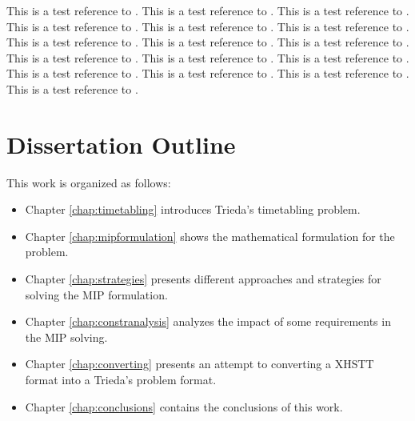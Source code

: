 This is a test reference to \cite{Carter2001}.    %
This is a test reference to \cite{Murray2007}.    %
This is a test reference to \cite{Unitime}.       %
This is a test reference to \cite{DSS}.           %
This is a test reference to \cite{Guenalay2006}.  %
This is a test reference to \cite{Schaerf99}.  		%
This is a test reference to \cite{Michael2002}.   %
This is a test reference to \cite{SchoolOverview2010}.   %
This is a test reference to \cite{Birbas2009}.    %
This is a test reference to \cite{Mimosasoftware}.
This is a test reference to \cite{Patat}.
This is a test reference to \cite{Hstt}.				  %
This is a test reference to \cite{ITC2007}.				%
This is a test reference to \cite{Ectt}.					%
This is a test reference to \cite{Udine}.
This is a test reference to \cite{Watt}.					%





\section{Dissertation Outline}
This work is organized as follows: 
\begin{itemize}
	\item Chapter \ref{chap:timetabling} introduces Trieda's timetabling problem.
	\item Chapter \ref{chap:mipformulation} shows the mathematical formulation for the problem.
	\item Chapter \ref{chap:strategies} presents different approaches and strategies for solving the MIP formulation.
	\item Chapter \ref{chap:constranalysis} analyzes the impact of some requirements in the MIP solving.
	\item Chapter \ref{chap:converting} presents an attempt to converting a XHSTT format into a Trieda's problem format.
	\item Chapter \ref{chap:conclusions} contains the conclusions of this work.
\end{itemize}